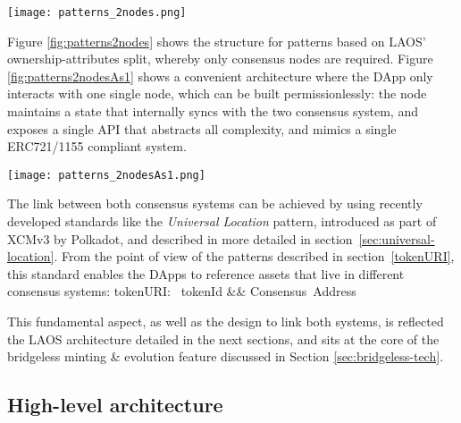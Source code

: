 \begin{Figure}
    \medskip
    \texttt{[image: patterns\_2nodes.png]}
    \medskip
    \label{fig:patterns2nodes}
\end{Figure}

Figure \ref{fig:patterns2nodes} shows the structure for patterns
based on LAOS' ownership-attributes split, whereby only consensus nodes are
required. Figure \ref{fig:patterns2nodesAs1} shows a convenient architecture
where the DApp only interacts with one single node, which can be built permissionlessly:
the node maintains a state that internally syncs with the two consensus system,
and exposes a single API that abstracts all complexity, and mimics a single ERC721/1155
compliant system. 

\begin{Figure}
    \medskip
    \texttt{[image: patterns\_2nodesAs1.png]}
    \medskip
    \label{fig:patterns2nodesAs1}
\end{Figure}

The link between both consensus systems can be achieved by using recently developed standards
like the {\it Universal Location} pattern, introduced as part of XCMv3 by
Polkadot, and described in more detailed in section \ref{sec:universal-location}.
From the point of view of the patterns described in section \ref{tokenURI},
this standard enables the DApps to reference assets that live in different
consensus systems:
\bea
\label{eq:tokenURIConsensus}
\mbox{tokenURI:} \mbox{ tokenId} &\rightarrow & \mbox{Consensus Address} 
\eea 

This fundamental aspect, as well as the design to link both systems,
is reflected the LAOS architecture detailed in the next
sections, and sits at the core of the bridgeless minting \& evolution feature
discussed in Section \ref{sec:bridgeless-tech}.

\subsection{High-level architecture}\label{sec:arch-highlevel}


